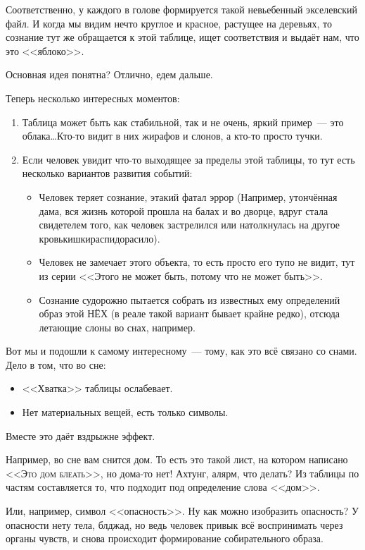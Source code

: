 \documentclass[a5paper,12pt,twoside]{memoir}
\begin{document}
Соответственно, у каждого в голове формируется такой невьебенный экселевский файл. И когда мы видим нечто круглое и красное, растущее на деревьях, то сознание тут же обращается к этой таблице, ищет соответствия и выдаёт нам, что это <<яблоко>>. 

Основная идея понятна? Отлично, едем дальше. 

Теперь несколько интересных моментов:
\begin{enumerate}
\item Таблица может быть как стабильной, так и не очень, яркий пример~--- это облака\ldots Кто-то видит в них жирафов и слонов, а кто-то просто тучки. 
\item Если человек увидит что-то выходящее за пределы этой таблицы, то тут есть несколько вариантов развития событий:
\begin{itemize}
\item Человек теряет сознание, этакий фатал эррор (Например, утончённая дама, вся жизнь которой прошла на балах и во дворце, вдруг стала свидетелем того, как человек застрелился или натолкнулась на другое кровькишкираспидорасило).
\item Человек не замечает этого объекта, то есть просто его тупо не видит, тут из серии <<Этого не может быть, потому что не может быть>>.
\item Сознание судорожно пытается собрать из известных ему определений образ этой НЁХ (в реале такой вариант бывает крайне редко), отсюда летающие слоны во снах, например.
\end{itemize}
\end{enumerate}

Вот мы и подошли к самому интересному~--- тому, как это всё связано со снами. Дело в том, что во сне:
\begin {itemize}
\item <<Хватка>> таблицы ослабевает. 
\item Нет материальных вещей, есть только символы.
\end{itemize}

Вместе это даёт вздрыжне эффект.
 
Например, во сне вам снится дом. То есть это такой лист, на котором написано <<\textsc{Это дом блеать}>>, но дома-то нет! Ахтунг, алярм, что делать? Из таблицы по частям составляется то, что подходит под определение слова <<дом>>. 

Или, например, символ <<опасность>>. Ну как можно изобразить опасность? У опасности нету тела, блджад, но ведь человек привык всё воспринимать через органы чувств, и снова происходит формирование собирательного образа. 
\end{document}
